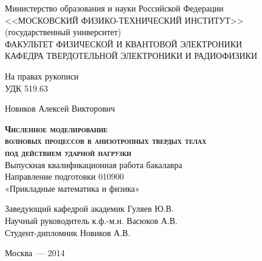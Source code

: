\begin{titlepage}
\newpage

\begin{center}
	Министерство образования и науки Российской Федерации \\
	<<МОСКОВСКИЙ ФИЗИКО-ТЕХНИЧЕСКИЙ ИНСТИТУТ>>\\(государственный университет)\\[0.5cm]
	ФАКУЛЬТЕТ ФИЗИЧЕСКОЙ И КВАНТОВОЙ ЭЛЕКТРОНИКИ\\
	КАФЕДРА ТВЕРДОТЕЛЬНОЙ ЭЛЕКТРОНИКИ И РАДИОФИЗИКИ\\
\end{center}

\vspace{0.5em}

\begin{flushright}
На правах рукописи \\
УДК 519.63
\end{flushright}

\vspace{1em}

\begin{center}
	Новиков Алексей Викторович
\end{center}

\vspace{0.5em}

\begin{center}
	\textsc{\textbf{Численное моделирование\\ 
		волновых процессов в анизотропных твердых телах\\
		под действием ударной нагрузки}}\\[1cm]
	Выпускная квалификационная работа бакалавра\\
	Направление подготовки 010900\\
	«Прикладные математика и физика»\\
\end{center}

\vspace{2em}

\begin{flushleft}
	Заведующий кафедрой \hrulefill академик Гуляев Ю.В.\\[0.5cm]
	Научный руководитель \hrulefill к.ф.-м.н. Васюков А.В.\\[0.5cm]
	Студент-дипломник \hrulefill Новиков А.В.\\
\end{flushleft}

\vspace{\fill}
\begin{center}
Москва~--- 2014
\end{center}

\end{titlepage}

